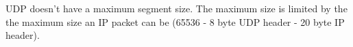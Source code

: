UDP doesn't have a maximum segment size. The maximum size is limited by the the maximum size an IP packet can be (65536 - 8 byte UDP header - 20 byte IP header).

